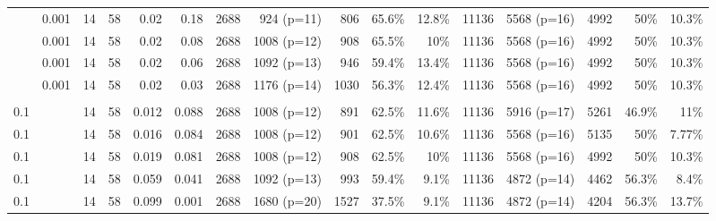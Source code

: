 \begin{landscape}
\begin{table}[p]
\begin{tabular}{rrrrrrrrrrrrrrrr}
		\color{red}{0.20} & 0.001 & 14 & 58 & 0.02 & 0.18 & 2688 & 924 (p=11) & 806 & 65.6\% & 12.8\% & 11136 & 5568 (p=16)& 4992 & 50\% & 10.3\% \\
		
		\color{red}{0.10} & 0.001 & 14 & 58 & 0.02 & 0.08 & 2688 & 1008 (p=12) & 908 & 65.5\% & 10\% & 11136 & 5568 (p=16)& 4992 & 50\% & 10.3\% \\
		
		\color{red}{0.08} & 0.001 & 14 & 58 & 0.02 & 0.06 & 2688 & 1092 (p=13) & 946 & 59.4\% & 13.4\% & 11136 & 5568 (p=16) & 4992 & 50\% & 10.3\% \\
		
		\color{red}{0.05} & 0.001 & 14 & 58 & 0.02 & 0.03 & 2688 & 1176 (p=14) & 1030 & 56.3\% & 12.4\% & 11136 & 5568 (p=16) & 4992 & 50\% & 10.3\% \\ \\
		
		
		0.1 & \color{red}{0.0006} & 14 & 58 & 0.012 & 0.088 & 2688 & 1008 (p=12) & 891 & 62.5\% & 11.6\% & 11136 & 5916 (p=17) & 5261 & 46.9\% & 11\% \\
		
		0.1 & \color{red}{0.0008} & 14 & 58 & 0.016 & 0.084 & 2688 & 1008 (p=12) & 901 & 62.5\% & 10.6\% & 11136 & 5568 (p=16) & 5135 & 50\% & 7.77\% \\
		
		0.1 & \color{red}{0.0010} & 14 & 58 & 0.019 & 0.081 & 2688 & 1008 (p=12) & 908 & 62.5\% & 10\% & 11136 & 5568 (p=16) & 4992 & 50\% & 10.3\% \\
		
		0.1 & \color{red}{0.0030} & 14 & 58 & 0.059 & 0.041 & 2688 &  1092 (p=13) & 993 & 59.4\% & 9.1\% & 11136 & 4872 (p=14) & 4462 & 56.3\% & 8.4\% \\
		
		0.1 & \color{red}{0.0050} & 14 & 58 & 0.099 & 0.001 & 2688 & 1680 (p=20) & 1527 & 37.5\% & 9.1\% & 11136 & 4872 (p=14) & 4204 & 56.3\% & 13.7\% \\
		

\end{tabular}
\end{table}
\end{landscape}
